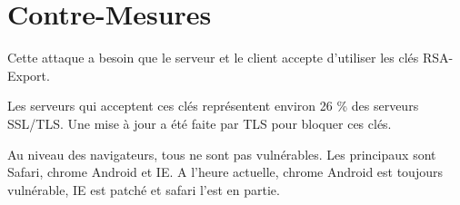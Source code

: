 \section{Contre-Mesures}
\label{sec:cmFreak}

Cette attaque a besoin que le serveur et le client accepte d'utiliser les clés RSA-Export.

Les serveurs qui acceptent ces clés représentent environ 26 \% des serveurs SSL/TLS. Une mise à jour a été faite par
TLS pour bloquer ces clés.

Au niveau des navigateurs, tous ne sont pas vulnérables. Les principaux sont Safari, chrome Android et IE. 
A l'heure actuelle, chrome Android est toujours vulnérable, IE est patché et safari l'est en partie.